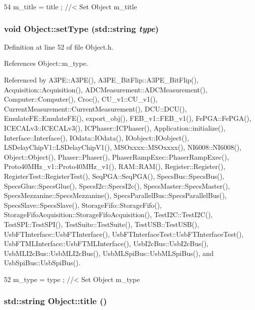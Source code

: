 \begin{DoxyCode}
54 { m_title = title ; } //< Set Object m_title
\end{DoxyCode}
\hypertarget{classObject_aae534cc9d982bcb9b99fd505f2e103a5}{
\subsubsection[{setType}]{\setlength{\rightskip}{0pt plus 5cm}void Object::setType (std::string {\em type})}}
\label{classObject_aae534cc9d982bcb9b99fd505f2e103a5}


Definition at line 52 of file Object.h.

References Object::m\_\-type.

Referenced by A3PE::A3PE(), A3PE\_\-BitFlip::A3PE\_\-BitFlip(), Acquisition::Acquisition(), ADCMeasurement::ADCMeasurement(), Computer::Computer(), Croc(), CU\_\-v1::CU\_\-v1(), CurrentMeasurement::CurrentMeasurement(), DCU::DCU(), EmulateFE::EmulateFE(), export\_\-obj(), FEB\_\-v1::FEB\_\-v1(), FePGA::FePGA(), ICECALv3::ICECALv3(), ICPhaser::ICPhaser(), Application::initialize(), Interface::Interface(), IOdata::IOdata(), IOobject::IOobject(), LSDelayChipV1::LSDelayChipV1(), MSOxxxx::MSOxxxx(), NI6008::NI6008(), Object::Object(), Phaser::Phaser(), PhaserRampExec::PhaserRampExec(), Proto40MHz\_\-v1::Proto40MHz\_\-v1(), RAM::RAM(), Register::Register(), RegisterTest::RegisterTest(), SeqPGA::SeqPGA(), SpecsBus::SpecsBus(), SpecsGlue::SpecsGlue(), SpecsI2c::SpecsI2c(), SpecsMaster::SpecsMaster(), SpecsMezzanine::SpecsMezzanine(), SpecsParallelBus::SpecsParallelBus(), SpecsSlave::SpecsSlave(), StorageFifo::StorageFifo(), StorageFifoAcquisition::StorageFifoAcquisition(), TestI2C::TestI2C(), TestSPI::TestSPI(), TestSuite::TestSuite(), TestUSB::TestUSB(), UsbFTInterface::UsbFTInterface(), UsbFTInterfaceTest::UsbFTInterfaceTest(), UsbFTMLInterface::UsbFTMLInterface(), UsbI2cBus::UsbI2cBus(), UsbMLI2cBus::UsbMLI2cBus(), UsbMLSpiBus::UsbMLSpiBus(), and UsbSpiBus::UsbSpiBus().


\begin{DoxyCode}
52 { m_type  = type  ; } //< Set Object m_type
\end{DoxyCode}
\hypertarget{classObject_a73a0f1a41828fdd8303dd662446fb6c3}{
\subsubsection[{title}]{\setlength{\rightskip}{0pt plus 5cm}std::string Object::title ()}}
\label{classObject_a73a0f1a41828fdd8303dd662446fb6c3}


